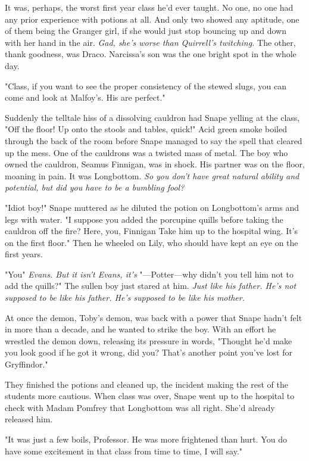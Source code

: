 It was, perhaps, the worst first year class he'd ever taught. No one, no one had any prior experience with potions at all. And only two showed any aptitude, one of them being the Granger girl, if she would just stop bouncing up and down with her hand in the air. \emph{Gad, she's worse than Quirrell's twitching.} The other, thank goodness, was Draco. Narcissa's son was the one bright spot in the whole day.

"Class, if you want to see the proper consistency of the stewed slugs, you can come and look at Malfoy's. His are perfect."

Suddenly the telltale hiss of a dissolving cauldron had Snape yelling at the class, "Off the floor! Up onto the stools and tables, quick!" Acid green smoke boiled through the back of the room before Snape managed to say the spell that cleared up the mess. One of the cauldrons was a twisted mass of metal. The boy who owned the cauldron, Seamus Finnigan, was in shock. His partner was on the floor, moaning in pain. It was Longbottom. \emph{So you don't have great natural ability and potential, but did you have to be a bumbling fool?}

"Idiot boy!" Snape muttered as he diluted the potion on Longbottom's arms and legs with water. "I suppose you added the porcupine quills before taking the cauldron off the fire? Here, you, Finnigan{\el} Take him up to the hospital wing. It's on the first floor." Then he wheeled on Lily, who should have kept an eye on the first years.

"You{\el}" \emph{Evans. But it isn't Evans, it's{\el}} "—Potter—why didn't you tell him not to add the quills?" The sullen boy just stared at him. \emph{Just like his father. He's not supposed to be like his father. He's supposed to be like his mother.}

At once the demon, Toby's demon, was back with a power that Snape hadn't felt in more than a decade, and he wanted to strike the boy. With an effort he wrestled the demon down, releasing its pressure in words, "Thought he'd make you look good if he got it wrong, did you? That's another point you've lost for Gryffindor."

They finished the potions and cleaned up, the incident making the rest of the students more cautious. When class was over, Snape went up to the hospital to check with Madam Pomfrey that Longbottom was all right. She'd already released him.

"It was just a few boils, Professor. He was more frightened than hurt. You do have some excitement in that class from time to time, I will say."

